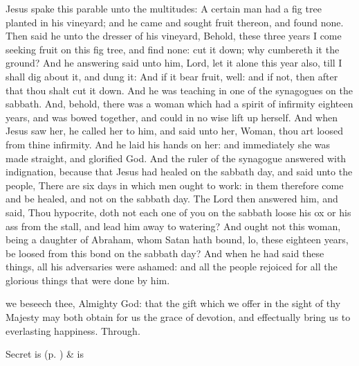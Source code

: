 
 Jesus spake this parable unto the multitudes: A certain man had a fig tree planted in his vineyard; and he came and sought fruit thereon, and found none. Then said he unto the dresser of his vineyard, Behold, these three years I come seeking fruit on this fig tree, and find none: cut it down; why cumbereth it the ground? And he answering said unto him, Lord, let it alone this year also, till I shall dig about it, and dung it: And if it bear fruit, well: and if not, then after that thou shalt cut it down. And he was teaching in one of the synagogues on the sabbath. And, behold, there was a woman which had a spirit of infirmity eighteen years, and was bowed together, and could in no wise lift up herself. And when Jesus saw her, he called her to him, and said unto her, Woman, thou art loosed from thine infirmity. And he laid his hands on her: and immediately she was made straight, and glorified God. And the ruler of the synagogue answered with indignation, because that Jesus had healed on the sabbath day, and said unto the people, There are six days in which men ought to work: in them therefore come and be healed, and not on the sabbath day. The Lord then answered him, and said, Thou hypocrite, doth not each one of you on the sabbath loose his ox or his ass from the stall, and lead him away to watering? And ought not this woman, being a daughter of Abraham, whom Satan hath bound, lo, these eighteen years, be loosed from this bond on the sabbath day? And when he had said these things, all his adversaries were ashamed: and all the people rejoiced for all the glorious things that were done by him.


\secret
{} we beseech thee, Almighty God: that the gift which we offer in the sight of thy Majesty may both obtain for us the grace of devotion, and effectually bring us to everlasting happiness. Through.
\begin{rubric}
     Secret is  (p. \pageref{SPSaints}) \&  is 
\end{rubric}


